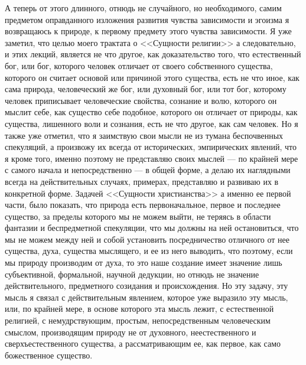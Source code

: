 \documentclass[12pt]{article}
\begin{document}
А теперь от этого длинного, отнюдь не случайного, но необходимого, самим предметом оправданного изложения развития чувства зависимости и эгоизма я возвращаюсь к природе, к первому предмету этого чувства зависимости. Я уже заметил, что целью моего трактата о <<Сущности религии>>  а следовательно, и этих лекций, является не что другое, как доказательство того, что естественный бог, или бог, которого человек отличает от своего собственного существа, которого он считает основой или причиной этого существа, есть не что иное, как сама природа, человеческий же бог, или духовный бог, или тот бог, которому человек приписывает человеческие свойства, сознание и волю, которого он мыслит себе, как существо себе подобное, которого он отличает от природы, как существа, лишенного воли и сознания, есть не что другое, как сам человек. Но я также уже отметил, что я заимствую свои мысли не из тумана беспочвенных спекуляций, а произвожу их всегда от исторических, эмпирических явлений, что я кроме того, именно поэтому не представляю своих мыслей --- по крайней мере с самого начала и непосредственно --- в общей форме, а делаю их наглядными всегда на действительных случаях, примерах, представляю и развиваю их в конкретной форме. Задачей <<Сущности христианства>>  а именно ее первой части, было показать, что природа есть первоначальное, первое и последнее существо, за пределы которого мы не можем выйти, не теряясь в области фантазии и беспредметной спекуляции, что мы должны на ней остановиться, что мы не можем между ней и собой установить посредничество отличного от нее существа, духа, существа мыслящего, и ее из него выводить, что поэтому, если мы природу производим от духа, то это наше создание имеет значение лишь субъективной, формальной, научной дедукции, но отнюдь не значение действительного, предметного созидания и происхождения. Но эту задачу, эту мысль я связал с действительным явлением, которое уже выразило эту мысль, или, по крайней мере, в основе которого эта мысль лежит, с естественной религией, с немудрствующим, простым, непосредственным человеческим смыслом, производящим природу не от духовного, неестественного и сверхъестественного существа, а рассматривающим ее, как первое, как само божественное существо. 
\end{document}
